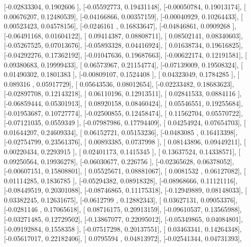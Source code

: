 \documentclass{article}
\begin{document}
       [-0.02833304,  0.1902606 ],
       [-0.05592773,  0.19431148],
       [-0.00050784,  0.19013174],
       [ 0.00676207,  0.12480539],
       [-0.04166866,  0.00357159],
       [-0.00040929,  0.10264433],
       [ 0.00523423,  0.04578156],
       [-0.0246161 ,  0.16833647],
       [-0.04846861,  0.0909268 ],
       [-0.06491168,  0.01604122],
       [ 0.09414387,  0.08808711],
       [ 0.08502141,  0.08340603],
       [-0.05267525,  0.07013676],
       [-0.05893328,  0.04416924],
       [ 0.01638734,  0.19616825],
       [-0.04292276,  0.17362192],
       [-0.01047636,  0.19687663],
       [-0.00622174,  0.12191581],
       [ 0.09380683,  0.19999433],
       [ 0.06573967,  0.21154774],
       [-0.07139009,  0.19508324],
       [ 0.01490302,  0.1801383 ],
       [-0.00809107,  0.1524408 ],
       [ 0.04323049,  0.1784285 ],
       [ 0.089316  ,  0.05917729],
       [ 0.05643536,  0.08012654],
       [-0.02233482,  0.18683623],
       [-0.02897708,  0.12143218],
       [ 0.06110196,  0.12913511],
       [ 0.02841533,  0.0884116 ],
       [-0.06859444,  0.05301913],
       [ 0.08920158,  0.08460424],
       [ 0.05546551,  0.19255684],
       [-0.01953687,  0.10727774],
       [-0.02500855,  0.12458474],
       [ 0.11562704,  0.05570722],
       [-0.07121035,  0.0559349 ],
       [-0.07987986,  0.17794409],
       [ 0.04254924,  0.07654703],
       [ 0.01644207,  0.24609334],
       [ 0.06152721,  0.05153236],
       [-0.0483085 ,  0.16413398],
       [-0.02754799,  0.23561376],
       [ 0.00893385,  0.0737998 ],
       [ 0.08143896,  0.09449211],
       [ 0.00220434,  0.2293915 ],
       [ 0.02401173,  0.1415345 ],
       [ 0.13637524,  0.14338571],
       [ 0.09250564,  0.19936278],
       [-0.06030677,  0.226756  ],
       [-0.02365628,  0.06378052],
       [-0.00607151,  0.15808801],
       [ 0.05525671,  0.08881067],
       [ 0.0081532 ,  0.06127082],
       [ 0.01114285,  0.1836785 ],
       [-0.05294382,  0.08918328],
       [-0.08968666,  0.11121116],
       [-0.08449519,  0.20301088],
       [-0.08746865,  0.11175318],
       [-0.12949889,  0.08148033],
       [ 0.03382245,  0.12631675],
       [-0.0612799 ,  0.12882343],
       [ 0.03627131,  0.09053376],
       [-0.0281146 ,  0.17065618],
       [ 0.08716175,  0.20913159],
       [-0.09610537,  0.13565988],
       [-0.03271485,  0.12729502],
       [-0.13867077,  0.22095012],
       [-0.05349865,  0.04084801],
       [-0.09192884,  0.1558358 ],
       [-0.07517298,  0.20137551],
       [ 0.03463341,  0.14264348],
       [-0.05617017,  0.22182406],
       [ 0.0795594 ,  0.04813972],
       [-0.02541344,  0.04731393],
\end{document}
